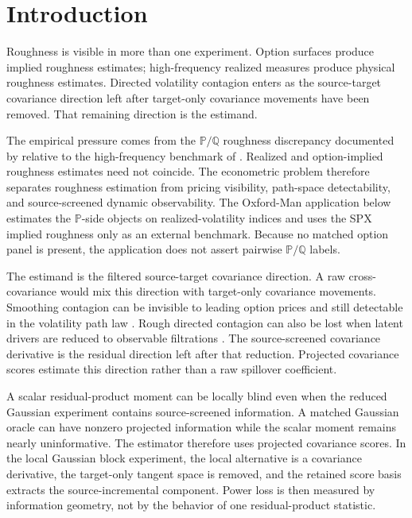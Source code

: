 \documentclass[11pt,a4paper]{amsart}
\theoremstyle{plain}
\theoremstyle{definition}
\theoremstyle{remark}
\newcommand{\PP}{\mathbb{P}}
\newcommand{\QQ}{\mathbb{Q}}
\begin{document}
\maketitle
\enlargethispage{3pt}


\section{Introduction}

Roughness is visible in more than one experiment.  Option surfaces produce implied roughness
estimates; high-frequency realized measures produce physical roughness estimates.  Directed
volatility contagion enters as the source-target covariance direction left after target-only
covariance movements have been removed.  That remaining direction is the estimand.

The empirical pressure comes from the \(\PP/\QQ\) roughness discrepancy documented by
\cite{livieri2018rough} relative to the high-frequency benchmark of
\cite{gatheral2018volatility}.  Realized and option-implied roughness estimates need not coincide.
The econometric problem therefore separates roughness estimation from pricing visibility, path-space
detectability, and source-screened dynamic observability.  The Oxford-Man application below estimates
the \(\PP\)-side objects on realized-volatility indices and uses the SPX implied roughness only as an
external benchmark.  Because no matched option panel is present, the application does not assert
pairwise \(\PP/\QQ\) labels.

The estimand is the filtered source-target covariance direction.  A raw cross-covariance would mix
this direction with target-only covariance movements.  Smoothing contagion can be invisible to
leading option prices and still detectable in the volatility path law \cite{vidal2026latent}.
Rough directed contagion can also be lost when latent drivers are reduced to observable filtrations
\cite{vidal2026dynamic}.  The source-screened covariance derivative is the residual direction left
after that reduction.  Projected covariance scores estimate this direction rather than a raw
spillover coefficient.

A scalar residual-product moment can be locally blind even when the reduced Gaussian experiment
contains source-screened information.  A matched Gaussian oracle can have nonzero projected
information while the scalar moment remains nearly uninformative.  The estimator therefore uses
projected covariance scores.  In the local Gaussian block experiment, the local alternative is a
covariance derivative, the target-only tangent space is removed, and the retained score basis
extracts the source-incremental component.  Power loss is then measured by information geometry,
not by the behavior of one residual-product statistic.
\end{document}
